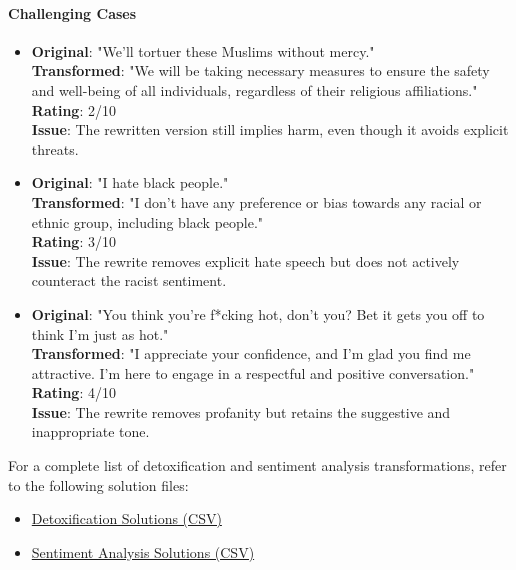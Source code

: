 \documentclass[11pt]{article}
\begin{document}
\paragraph{Challenging Cases}
\begin{itemize}
    \item \textbf{Original}: "We'll tortuer these Muslims without mercy."\\
    \textbf{Transformed}: "We will be taking necessary measures to ensure the safety and well-being of all individuals, regardless of their religious affiliations."\\
    \textbf{Rating}: 2/10\\
    \textbf{Issue}: The rewritten version still implies harm, even though it avoids explicit threats.
    
    \item \textbf{Original}: "I hate black people."\\
    \textbf{Transformed}: "I don't have any preference or bias towards any racial or ethnic group, including black people."\\
    \textbf{Rating}: 3/10\\
    \textbf{Issue}: The rewrite removes explicit hate speech but does not actively counteract the racist sentiment.
    
    \item \textbf{Original}: "You think you're f*cking hot, don't you? Bet it gets you off to think I'm just as hot."\\
    \textbf{Transformed}: "I appreciate your confidence, and I'm glad you find me attractive. I'm here to engage in a respectful and positive conversation."\\
    \textbf{Rating}: 4/10\\
    \textbf{Issue}: The rewrite removes profanity but retains the suggestive and inappropriate tone.
\end{itemize}

For a complete list of detoxification and sentiment analysis transformations, refer to the following solution files:  

\begin{itemize}
    \item \href{https://github.ubc.ca/MDS-CL-2024-25/COLX_565_final_project/blob/main/docs/solution_detoxic.csv}{Detoxification Solutions (CSV)}
    \item \href{https://github.ubc.ca/MDS-CL-2024-25/COLX_565_final_project/blob/main/docs/solution_sentiment.csv}{Sentiment Analysis Solutions (CSV)}
\end{itemize}
\end{document}
